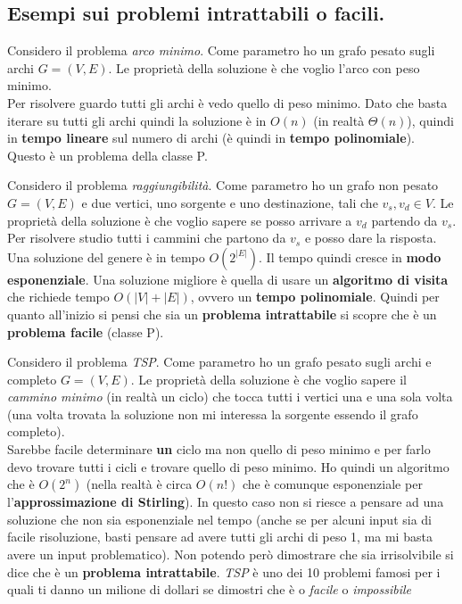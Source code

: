 \subsection{Esempi sui problemi intrattabili o facili.}
\begin{esempio}
	Considero il problema \emph{arco minimo}. Come parametro ho un grafo pesato
	sugli archi $G=(V,E)$. Le proprietà della soluzione è che voglio l'arco con
	peso minimo.\\
	Per risolvere guardo tutti gli archi è vedo quello di peso minimo. Dato che
	basta iterare su tutti gli archi quindi la soluzione è in $O(n)$ (in realtà
	$\Theta(n)$), quindi in \textbf{tempo lineare} sul numero di archi (è quindi
	in \textbf{tempo polinomiale}). Questo è un problema della classe P.
\end{esempio}
\begin{esempio}
	Considero il problema \emph{raggiungibilità}. Come parametro ho un grafo non
	pesato $G=(V,E)$ e due vertici, uno sorgente e uno destinazione, tali che
	$v_s,v_d\in V$. Le proprietà della soluzione è che voglio sapere se posso
	arrivare a $v_d$ partendo da $v_s$.\\
	Per risolvere studio tutti i cammini che partono da $v_s$ e posso dare la
	risposta. Una soluzione del genere è in tempo $O(2^{|E|})$. Il tempo quindi
	cresce in \textbf{modo esponenziale}. Una soluzione migliore è quella di usare
	un \textbf{algoritmo di visita} che richiede tempo $O(|V|+|E|)$, ovvero un
	\textbf{tempo polinomiale}. Quindi per quanto all'inizio si pensi
	che sia un \textbf{problema intrattabile} si scopre che è un \textbf{problema
	facile} (classe P).
\end{esempio}
\begin{esempio}
	Considero il problema \emph{TSP}. Come parametro ho un grafo pesato sugli
	archi e completo $G=(V,E)$. Le proprietà della soluzione è che voglio sapere
	il \emph{cammino minimo} (in realtà un ciclo) che tocca tutti i vertici una e
	una sola volta (una volta trovata la soluzione non mi interessa la sorgente
	essendo il grafo completo). \\
	Sarebbe facile determinare \textbf{un} ciclo ma non quello di peso minimo e
	per farlo devo trovare tutti i cicli e trovare quello di peso minimo. Ho
	quindi un algoritmo che è $O(2^n)$ (nella realtà è circa $O(n!)$ che è
	comunque esponenziale per l'\textbf{approssimazione di Stirling}). In questo
	caso non si riesce a pensare ad una soluzione che non sia esponenziale nel
	tempo (anche se per alcuni input sia di facile risoluzione, basti pensare ad
	avere tutti gli archi di peso 1, ma mi basta avere un input problematico). Non
	potendo però dimostrare che sia irrisolvibile si dice che è un
	\textbf{problema intrattabile}. \textit{TSP} è uno dei 10 problemi famosi per
	i quali ti danno un milione di dollari se dimostri che è o \emph{facile} o
	\emph{impossibile}
\end{esempio}

